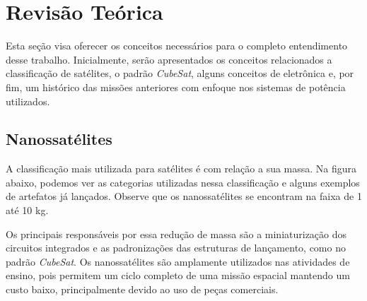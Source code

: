 \chapter{Revisão Teórica} \label{revisao}

Esta seção visa oferecer os conceitos necessários para o completo entendimento desse trabalho. Inicialmente, serão apresentados os conceitos relacionados a classificação de satélites, o padrão \textit{CubeSat}, alguns conceitos de eletrônica e, por fim, um histórico das missões anteriores com enfoque nos sistemas de potência utilizados.

\section{Nanossatélites}\label{nanosats_revision}
A classificação mais utilizada para satélites é com relação a sua massa. Na figura abaixo, podemos ver as categorias utilizadas nessa classificação e alguns exemplos de artefatos já lançados. Observe que os nanossatélites se encontram na faixa de 1 até 10 kg.

\noindent
\begin{minipage}{\linewidth}
\label{mass_classification_fig}
\end{minipage}

 Os principais responsáveis por essa redução de massa são a miniaturização dos circuitos integrados e as padronizações das estruturas de lançamento, como no padrão \textit{CubeSat}. Os nanossatélites são amplamente utilizados nas atividades de ensino, pois permitem um ciclo completo de uma missão espacial mantendo um custo baixo, principalmente devido ao uso de peças comerciais.\cite{barnhart_ref}

